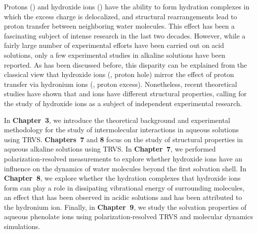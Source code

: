 Protons () and hydroxide ions () have the ability to form hydration complexes in which the excess charge is delocalized, and structural rearrangements lead to proton transfer between neighboring water molecules. This effect has been a fascinating subject of intense research in the last two decades. However, while a fairly large number of experimental efforts have been carried out on acid solutions,\!\cite{Woutersen2006,Moilanen2008,Peighambardoust2010,Liu2015,Fournier2018} only a few experimental studies in alkaline solutions have been reported.\!\cite{Roberts2009,Roberts2011,Mandal2014,Mandal2015,Biswas2017} As has been discussed before,\!\cite{Marx2010} this disparity can be explained from the classical view that hydroxide ions (, proton hole) mirror the effect of proton transfer via hydronium ions (, proton excess). Nonetheless, recent theoretical studies have shown that  and  ions have different structural properties, calling for the study of hydroxide ions as a subject of independent experimental research.\!\cite{Tuckerman2002,Chen2002,Sun2009,Bucher2010,Hassanali2011,Roberts2014,Chen2018a}


In \textbf{Chapter~3}, we introduce the theoretical background and experimental methodology for the study of intermolecular interactions in aqueous solutions using TRVS. \textbf{Chapters~7} and \textbf{8} focus on the study of structural properties in aqueous alkaline solutions using TRVS. In \textbf{Chapter~7}, we performed polarization-resolved measurements to explore whether hydroxide ions have an influence on the dynamics of water molecules beyond the first solvation shell. In \textbf{Chapter~8}, we explore whether the hydration complexes that hydroxide ions form can play a role in dissipating vibrational energy of surrounding molecules, an effect that has been observed in acidic solutions and has been attributed to the hydronium ion.\!\cite{Timmer2010} Finally, in \textbf{Chapter~9}, we study the solvation properties of aqueous phenolate ions using polarization-resolved TRVS and molecular dynamics simulations. 








